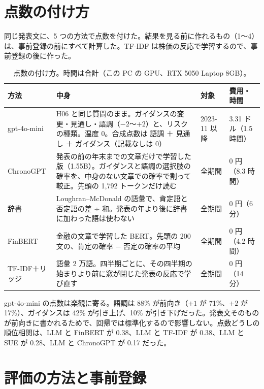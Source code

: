 \documentclass[xelatex,ja=standard,jafont=haranoaji,a4paper,10pt,openany]{bxjsreport}
\begin{document}
\chapter{点数の付け方}\label{ch:scores}

同じ発表文に、5 つの方法で点数を付けた。結果を見る前に作れるもの（1〜4）は、事前登録の前にすべて計算した。TF-IDF は株価の反応で学習するので、事前登録の後に作った。

\begin{table}[htbp]
\centering
\caption{点数の付け方。時間は合計（この PC の GPU、RTX 5050 Laptop 8GB）。}
\label{tab:scorers}
\small
\begin{tabular}{p{2.6cm}p{6.6cm}p{2.0cm}p{2.4cm}}
\toprule
方法 & 中身 & 対象 & 費用・時間 \\
\midrule
gpt-4o-mini & H06 と同じ質問のまま。ガイダンスの変更・見通し・語調（$-2$〜$+2$）と、リスクの種類。温度 0。合成点数は 語調 ＋ 見通し ＋ ガイダンス（記載なしは 0） & 2023-11 以降 & 3.31 ドル（1.5 時間） \\
ChronoGPT & 発表の前の年末までの文章だけで学習した版（1.55B）。ガイダンスと語調の選択肢の確率を、中身のない文章での確率で割って較正。先頭の 1,792 トークンだけ読む & 全期間 & 0 円（8.3 時間） \\
辞書 & Loughran--McDonald の語彙で、肯定語と否定語の差 $\div$ 和。発表の年より後に辞書に加わった語は使わない & 全期間 & 0 円（6 分） \\
FinBERT & 金融の文章で学習した BERT。先頭の 200 文の、肯定の確率 $-$ 否定の確率の平均 & 全期間 & 0 円（4.2 時間） \\
TF-IDF＋リッジ & 語彙 2 万語。四半期ごとに、その四半期の始まりより前に窓が閉じた発表の反応で学び直す & 全期間 & 0 円（14 分） \\
\bottomrule
\end{tabular}
\end{table}

gpt-4o-mini の点数は楽観に寄る。語調は 88\% が前向き（$+1$ が 71\%、$+2$ が 17\%）、ガイダンスは 42\% が引き上げ、10\% が引き下げだった。発表文そのものが前向きに書かれるためで、回帰では標準化するので影響しない。点数どうしの順位相関は、LLM と FinBERT が 0.38、LLM と TF-IDF が 0.38、LLM と SUE が 0.28、LLM と ChronoGPT が 0.17 だった。

\chapter{評価の方法と事前登録}\label{ch:method}
\end{document}
